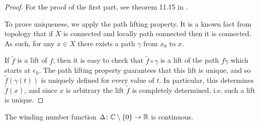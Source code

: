 \begin{proof}
For the proof of the first part, see theorem 11.15 in \cite{leetopological}.

To prove uniqueness, we apply the path lifting property. It is a known fact from topology that if $X$ is connected and locally path connected then it is connected. As such, for any $x \in X$ there exists a path $\gamma$ from $x_0$ to $x$.

If $\tilde f$ is a lift of $f$, then it is easy to check that $\tilde f \circ \gamma$ is a lift of the path $f \tilde \gamma$ which starts at $e_0$. The path lifting property guarantees that this lift is unique, and so $\tilde f(\gamma(t))$ is uniquely defined for every value of $t$. In particular, this determines $\tilde f(x)$, and since $x$ is arbitrary the lift $\tilde f$ is completely determined, i.e. such a lift is unique.
\end{proof}

\begin{prop}\label{deltacontinuous}
The winding number function $\Delta \colon \mathbb{C} \setminus \{0\} \to \mathbb{R}$ is continuous.
\end{prop}

